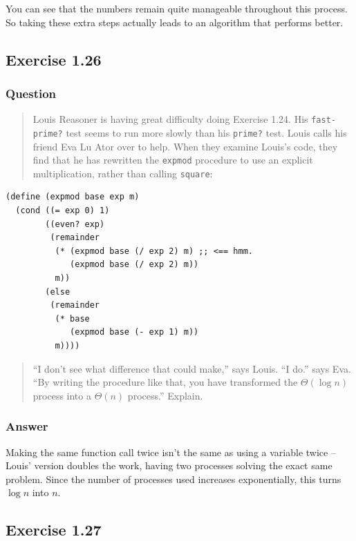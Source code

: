 \documentclass[final,fleqn,titlepage]{article}
\begin{document}
You can see that the numbers remain quite manageable throughout this process. So
taking these extra steps actually leads to an algorithm that performs better.

\subsection{Exercise 1.26}
\label{sec:orgb822354}
\subsubsection{Question}
\label{sec:org7f7da74}
\begin{quote}
Louis Reasoner is having great difficulty doing Exercise 1.24. His \texttt{fast-prime?}
test seems to run more slowly than his \texttt{prime?} test. Louis calls his friend Eva
Lu Ator over to help. When they examine Louis’s code, they find that he has
rewritten the \texttt{expmod} procedure to use an explicit multiplication, rather than
calling \texttt{square}:
\end{quote}

\begin{verbatim}
(define (expmod base exp m)
  (cond ((= exp 0) 1)
        ((even? exp)
         (remainder 
          (* (expmod base (/ exp 2) m) ;; <== hmm.
             (expmod base (/ exp 2) m))
          m))
        (else
         (remainder 
          (* base 
             (expmod base (- exp 1) m))
          m))))
\end{verbatim}

\begin{quote}
“I don’t see what difference that could make,” says Louis. “I do.” says Eva. “By
writing the procedure like that, you have transformed the \(\Theta(\log n)\)
process into a \(\Theta(n)\) process.” Explain.
\end{quote}

\subsubsection{Answer}
\label{sec:org37c46b9}
Making the same function call twice isn't the same as using a variable twice --
Louis' version doubles the work, having two processes solving the exact same
problem. Since the number of processes used increases exponentially, this turns
\(\log n\) into \(n\).

\subsection{Exercise 1.27}
\label{sec:orga387670}
\end{document}
